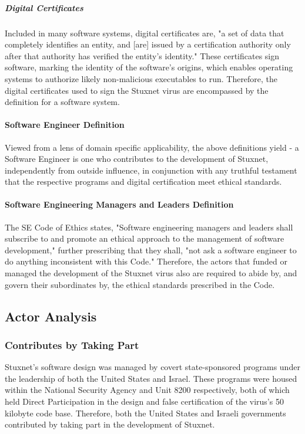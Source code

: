 \documentclass[12pt]{article}
\begin{document}
\begin{multicols}{2}
\subparagraph{Digital Certificates}

Included in many software systems, digital certificates are, "a set of data that completely identifies an entity, and [are] issued by a certification authority only after that authority has verified the entity's identity."\cite{digitalCertificateDefintion} These certificates sign software, marking the identity of the software's origins, which enables operating systems to authorize likely non-malicious executables to run. Therefore, the digital certificates used to sign the Stuxnet virus are encompassed by the definition for a software system.

\paragraph{Software Engineer Definition}

Viewed from a lens of domain specific applicability, the above definitions yield - a Software Engineer is one who contributes to the development of Stuxnet, independently from outside influence, in conjunction with any truthful testament that the respective programs and digital certification meet ethical standards.

\paragraph{Software Engineering Managers and Leaders Definition}

The SE Code of Ethics states, "Software engineering managers and leaders shall subscribe to and promote an ethical approach to the management of software development," further prescribing that they shall, "not ask a software engineer to do anything inconsistent with this Code."\cite{softwareEngineeringCodeOfEthics} Therefore, the actors that funded or managed the development of the Stuxnet virus also are required to abide by, and govern their subordinates by, the ethical standards prescribed in the Code.


\subsection{Actor Analysis}

\subsubsection{Contributes by Taking Part}

Stuxnet's software design was managed by covert state-sponsored programs under the leadership of both the United States and Israel. These programs were housed within the National Security Agency and Unit 8200 respectively, both of which held Direct Participation in the design and false certification of the virus's 50 kilobyte code base.\cite{NationalSecurityAgencyAndUnit8200}\cite{w32.stuxnetDossier} Therefore, both the United States and Israeli governments contributed by taking part in the development of Stuxnet.


\end{multicols}
\end{document}
